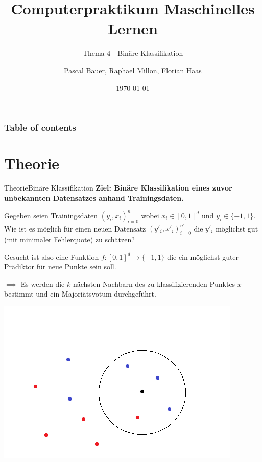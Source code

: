 \documentclass[9pt]{beamer}
\title{Computerpraktikum Maschinelles Lernen}
\subtitle{Thema 4 - Binäre Klassifikation}
\author{Pascal Bauer, Raphael Millon, Florian Haas}
\institute{Sommersemester 2020}
\date{\today}
\begin{document}
\titlepage 

\begin{frame}
 \frametitle{Table of contents}
 \tableofcontents
\end{frame}

\section{Theorie}
\begin{frame}{Theorie}{Binäre Klassifikation}
\textbf{Ziel: Binäre Klassifikation eines zuvor unbekannten Datensatzes anhand Trainingsdaten.}

Gegeben seien Trainingsdaten $(y_i,x_i)_{i=0}^n$ wobei $x_i \in [0, 1]^d$ und $y_i \in \{-1, 1\}$.
Wie ist es möglich für einen neuen Datensatz $(y'_i,x'_i)_{i=0}^{n'}$ die $y'_i$ möglichst gut (mit minimaler Fehlerquote) zu schätzen?

Gesucht ist also eine Funktion $f \colon [0,1]^d \to \{-1,1\}$ die ein möglichst guter Prädiktor für neue Punkte sein soll.

$\implies$ Es werden die $k$-nächsten Nachbarn des zu klassifizierenden Punktes $x$ bestimmt und ein Majoriätsvotum durchgeführt.
\begin{center}\includegraphics[scale=0.40]{assets/knearest.png}\end{center}
\end{frame}
\end{document}
